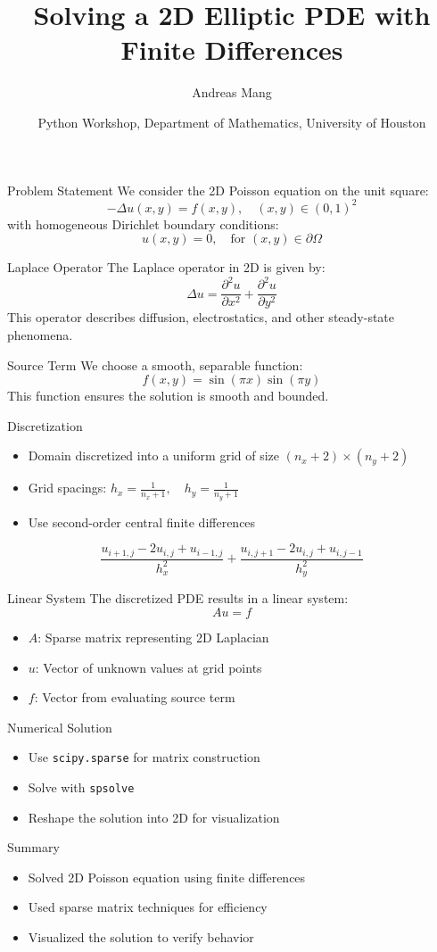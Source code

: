 \documentclass[mathserif,20pt,xcolor=table,compress,aspectratio=169]{beamer}
\title[]{\large Solving a 2D Elliptic PDE with Finite Differences}
\author[]{Andreas Mang}
\institute[]{Department of Mathematics, Scientific Computing, Optimization, and Parallel Algorithms Lab, University of Houston}
\date[]{Python Workshop, Department of Mathematics, University of Houston}
\begin{document}
\begin{frame}[plain,label=mytitlepage]
\titlepage
\end{frame}


\begin{frame}{Problem Statement}
We consider the 2D Poisson equation on the unit square:
\[
- \Delta u(x, y) = f(x, y), \quad (x, y) \in (0, 1)^2
\]
with homogeneous Dirichlet boundary conditions:
\[
u(x, y) = 0, \quad \text{for } (x, y) \in \partial \Omega
\]
\end{frame}


\begin{frame}{Laplace Operator}
The Laplace operator in 2D is given by:
\[
\Delta u = \frac{\partial^2 u}{\partial x^2} + \frac{\partial^2 u}{\partial y^2}
\]
This operator describes diffusion, electrostatics, and other steady-state phenomena.
\end{frame}


\begin{frame}{Source Term}
We choose a smooth, separable function:
\[
f(x, y) = \sin(\pi x)\sin(\pi y)
\]
This function ensures the solution is smooth and bounded.
\end{frame}


\begin{frame}{Discretization}
\begin{itemize}
    \item Domain discretized into a uniform grid of size \( (n_x+2) \times (n_y+2) \)
    \item Grid spacings: \( h_x = \frac{1}{n_x+1}, \quad h_y = \frac{1}{n_y+1} \)
    \item Use second-order central finite differences
\end{itemize}
\[
\frac{u_{i+1,j} - 2u_{i,j} + u_{i-1,j}}{h_x^2} + \frac{u_{i,j+1} - 2u_{i,j} + u_{i,j-1}}{h_y^2}
\]
\end{frame}


\begin{frame}{Linear System}
The discretized PDE results in a linear system:
\[
A u = f
\]
\begin{itemize}
    \item \( A \): Sparse matrix representing 2D Laplacian
    \item \( u \): Vector of unknown values at grid points
    \item \( f \): Vector from evaluating source term
\end{itemize}
\end{frame}

\begin{frame}{Numerical Solution}
\begin{itemize}
    \item Use \texttt{scipy.sparse} for matrix construction
    \item Solve with \texttt{spsolve}
    \item Reshape the solution into 2D for visualization
\end{itemize}
\end{frame}

\begin{frame}{Summary}
\begin{itemize}
    \item Solved 2D Poisson equation using finite differences
    \item Used sparse matrix techniques for efficiency
    \item Visualized the solution to verify behavior
\end{itemize}
\end{frame}
\end{document}
